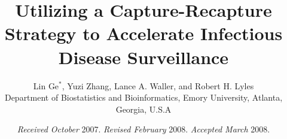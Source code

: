 \documentclass[useAMS,usenatbib,referee]{biom}
\title[Utilizing a Capture-Recapture Strategy to Accelerate Infectious Disease Surveillance]{Utilizing a Capture-Recapture Strategy to Accelerate Infectious Disease Surveillance}
\author{Lin Ge$^*$\email{lge\_biostat@outlook.com}, 
Yuzi Zhang, Lance A. Waller, and Robert H. Lyles \\
Department of Biostatistics and Bioinformatics, Emory University, Atlanta, Georgia, U.S.A}
\begin{document}

\date{{\it Received October} 2007. {\it Revised February} 2008.  {\it
Accepted March} 2008.}



\pagerange{\pageref{firstpage}--\pageref{lastpage}} 




\label{firstpage}

\end{document}

